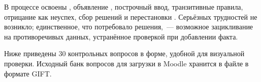 \documentclass[14pt,a4paper]{extarticle}
\begin{document}
В процессе освоены , объявление , построчный ввод, транзитивные правила, отрицание как неуспех, сбор решений  и перестановки . Серьёзных трудностей не возникло; единственное, что потребовало решения,~--- возможное зацикливание  на противоречивых данных, устранённое проверкой при добавлении факта.

\newpage
{}

Ниже приведены 30 контрольных вопросов в форме, удобной для визуальной проверки. Исходный банк вопросов для загрузки в Moodle хранится в файле  в формате GIFT.


\end{document}
